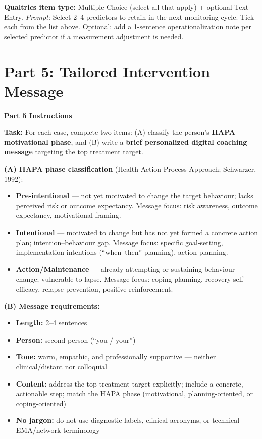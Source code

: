 \documentclass[11pt,a4paper]{article}
\newcommand{\checkboxresponse}[1]{\begin{tcolorbox}[colback=ResponseBG,colframe=GoldAmber,boxrule=0.6pt,arc=1.5mm,left=6pt,right=6pt,top=5pt,bottom=5pt]\small\textbf{\color{GoldAmber}Qualtrics item type:} Multiple Choice (select all that apply) + optional Text Entry. \quad \textit{Prompt:} #1\end{tcolorbox}}
\begin{document}
\checkboxresponse{Select 2--4 predictors to retain in the next monitoring cycle. Tick each from the list above. Optional: add a 1-sentence operationalization note per selected predictor if a measurement adjustment is needed.}

\newpage

\section{Part 5: Tailored Intervention Message}

\begin{tcolorbox}[colback=PartFiveBG,colframe=TealGreen,arc=2.5mm,boxrule=0.9pt,left=10pt,right=10pt,top=9pt,bottom=9pt]
\textbf{\color{TealGreen}Part 5 Instructions}

\smallskip
\textbf{Task:} For each case, complete two items: (A) classify the person's \textbf{HAPA motivational phase}, and (B) write a \textbf{brief personalized digital coaching message} targeting the top treatment target.

\textbf{(A) HAPA phase classification} (Health Action Process Approach; Schwarzer, 1992):
\begin{itemize}[topsep=3pt,itemsep=2pt]
\item \textbf{Pre-intentional} --- not yet motivated to change the target behaviour; lacks perceived risk or outcome expectancy. Message focus: risk awareness, outcome expectancy, motivational framing.
\item \textbf{Intentional} --- motivated to change but has not yet formed a concrete action plan; intention--behaviour gap. Message focus: specific goal-setting, implementation intentions (``when--then'' planning), action planning.
\item \textbf{Action/Maintenance} --- already attempting or sustaining behaviour change; vulnerable to lapse. Message focus: coping planning, recovery self-efficacy, relapse prevention, positive reinforcement.
\end{itemize}

\textbf{(B) Message requirements:}
\begin{itemize}[topsep=3pt,itemsep=2pt]
\item \textbf{Length:} 2--4 sentences
\item \textbf{Person:} second person (``you / your'')
\item \textbf{Tone:} warm, empathic, and professionally supportive --- neither clinical/distant nor colloquial
\item \textbf{Content:} address the top treatment target explicitly; include a concrete, actionable step; match the HAPA phase (motivational, planning-oriented, or coping-oriented)
\item \textbf{No jargon:} do not use diagnostic labels, clinical acronyms, or technical EMA/network terminology
\end{itemize}


\end{tcolorbox}
\end{document}
